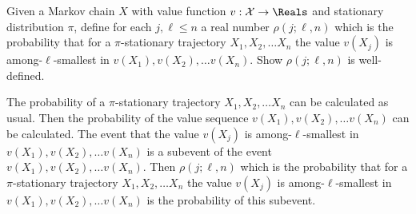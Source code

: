 \documentclass[12pt]{article}
\begin{document}
\begin{exercise}
    Given a Markov chain \( X \) with value function \( v:  \mathcal{X}
    \to \Reals \) and stationary distribution \( \pi \), define for each
    \( j, \ell \le n \) a real number \( \rho(j; \ell, n) \) which is
    the probability that for a \( \pi \)-stationary trajectory \( X_1, X_2,
    \dots X_n \) the value \( v(X_j) \) is among-\( \ell \)-smallest in \(
    v(X_1), v(X_2), \dots v(X_n) \).  Show \( \rho(j; \ell, n) \) is
    well-defined.
\end{exercise}
\begin{solution}
    The probability of a \( \pi \)-stationary trajectory \( X_1, X_2,
    \dots X_n \) can be calculated as usual.  Then the probability of
    the value sequence \( v(X_1), v(X_2), \dots v(X_n) \) can be
    calculated. The event that the value \( v(X_j) \) is among-\( \ell \)-smallest
    in \( v(X_1), v(X_2), \dots v(X_n) \) is a subevent of the event \(
    v(X_1), v(X_2), \dots v(X_n) \).  Then \( \rho(j; \ell, n) \) which
    is the probability that for a \( \pi \)-stationary trajectory \( X_1,
    X_2, \dots X_n \) the value \( v(X_j) \) is among-\( \ell \)-smallest
    in \( v(X_1), v(X_2), \dots v(X_n) \) is the probability of this
    subevent.
\end{solution}
\end{document}
